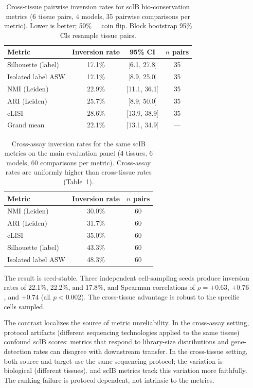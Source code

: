 \documentclass[11pt]{article}
\begin{document}
\begin{table}[t]
\centering
\caption{Cross-tissue pairwise inversion rates for scIB
bio-conservation metrics (6 tissue pairs, 4 models, 35 pairwise
comparisons per metric). Lower is better; 50\% = coin flip. Block
bootstrap 95\% CIs resample tissue pairs.}
\label{tab:crosstissue}
\small
\begin{tabular}{@{}lccc@{}}
\toprule
Metric & Inversion rate & 95\% CI & $n$ pairs \\
\midrule
Silhouette (label)   & 17.1\% & [6.1, 27.8] & 35 \\
Isolated label ASW   & 17.1\% & [8.9, 25.0] & 35 \\
NMI (Leiden)         & 22.9\% & [11.1, 36.1] & 35 \\
ARI (Leiden)         & 25.7\% & [8.9, 50.0] & 35 \\
cLISI                & 28.6\% & [13.9, 38.9] & 35 \\
\midrule
Grand mean           & 22.1\% & [13.1, 34.9] & --- \\
\bottomrule
\end{tabular}
\end{table}

\begin{table}[t]
\centering
\caption{Cross-assay inversion rates for the same scIB metrics on the
main evaluation panel (4 tissues, 6 models, 60 comparisons per metric).
Cross-assay rates are uniformly higher than cross-tissue rates
(Table~\ref{tab:crosstissue}).}
\label{tab:crossassay_inv}
\small
\begin{tabular}{@{}lcc@{}}
\toprule
Metric & Inversion rate & $n$ pairs \\
\midrule
NMI (Leiden)         & 30.0\% & 60 \\
ARI (Leiden)         & 31.7\% & 60 \\
cLISI                & 35.0\% & 60 \\
Silhouette (label)   & 43.3\% & 60 \\
Isolated label ASW   & 48.3\% & 60 \\
\bottomrule
\end{tabular}
\end{table}

The result is seed-stable. Three independent cell-sampling seeds produce
inversion rates of 22.1\%, 22.2\%, and 17.8\%, and Spearman
correlations of $\rho = +0.63$, $+0.76$, and $+0.74$ (all
$p < 0.002$). The cross-tissue advantage is robust to the specific
cells sampled.

The contrast localizes the source of metric unreliability. In the
cross-assay setting, protocol artifacts (different sequencing
technologies applied to the same tissue) confound scIB scores: metrics
that respond to library-size distributions and gene-detection rates
can disagree with downstream transfer. In the cross-tissue setting, both
source and target use the same sequencing protocol; the variation is
biological (different tissues), and scIB metrics track this variation
more faithfully. The ranking failure is protocol-dependent, not
intrinsic to the metrics.
\end{document}
